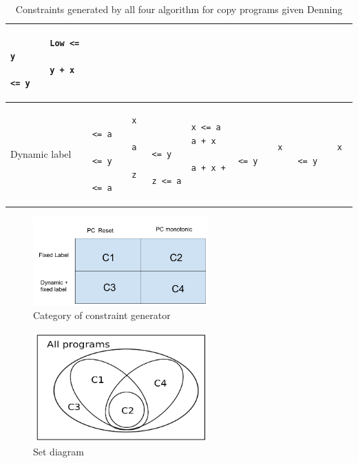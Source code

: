 \begin{table}
\begin{tabular}{|l|l|l|l|l|}
\begin{lstlisting}
		Low <= y
		y + x <= y
		\end{lstlisting}\\
		\hline
		Dynamic label&
		\begin{lstlisting}
		x <= a
		a <= y
		z <= a
		\end{lstlisting}&
		\begin{lstlisting}
		x <= a
		a + x <= y
		a + x + z <= a
		\end{lstlisting} &
		\begin{lstlisting}
		x <= y
		\end{lstlisting}&
		\begin{lstlisting}
		x <= y
		\end{lstlisting}\\
		\hline
	\end{tabular}
	\label{tbl:compcopy}
	\caption{Constraints generated by all four algorithm for copy programs given Denning \cite{denning}}
\end{table}
\begin{figure}[h]
	\includegraphics[width=0.6\textwidth]{category}
	\centering
	\caption{Category of constraint generator}
	\label{fig:set}
\end{figure}
\begin{figure}[h]
	\includegraphics[width=0.6\textwidth]{rsz_set}
	\centering
	\caption{Set diagram}
	\label{fig:set}
\end{figure}
